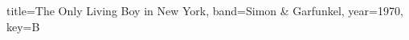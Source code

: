 \documentclass{skrul-leadsheet}
\begin{document}
\begin{song}[transpose-capo=true]{title={The Only Living Boy in New York}, band={Simon \& Garfunkel}, year={1970}, key={B}}



\end{song}
\end{document}
